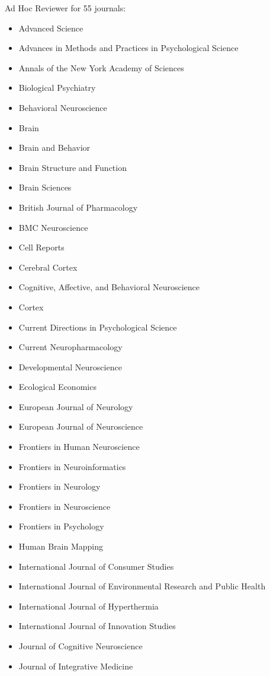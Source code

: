 \documentclass[11pt, letterpaper]{article}
\begin{document}
Ad Hoc Reviewer for 55 journals:
\begin{multicols}{2}
\begin{itemize}[noitemsep]
\itshape
\item Advanced Science
\item Advances in Methods and Practices in Psychological Science
\item Annals of the New York Academy of Sciences
\item Biological Psychiatry
\item Behavioral Neuroscience
\item Brain
\item Brain and Behavior
\item Brain Structure and Function
\item Brain Sciences
\item British Journal of Pharmacology
\item BMC Neuroscience 
\item Cell Reports
\item Cerebral Cortex 
\item Cognitive, Affective, and Behavioral Neuroscience 
\item Cortex
\item Current Directions in Psychological Science
\item Current Neuropharmacology
\item Developmental Neuroscience 
\item Ecological Economics
\item European Journal of Neurology
\item European Journal of Neuroscience
\item Frontiers in Human Neuroscience 
\item Frontiers in Neuroinformatics 
\item Frontiers in Neurology 
\item Frontiers in Neuroscience 
\item Frontiers in Psychology 
\item Human Brain Mapping 
\item International Journal of Consumer Studies
\item International Journal of Environmental Research and Public Health
\item International Journal of Hyperthermia 
\item International Journal of Innovation Studies
\item Journal of Cognitive Neuroscience 
\item Journal of Integrative Medicine 

\end{itemize}
\end{multicols}
\end{document}
